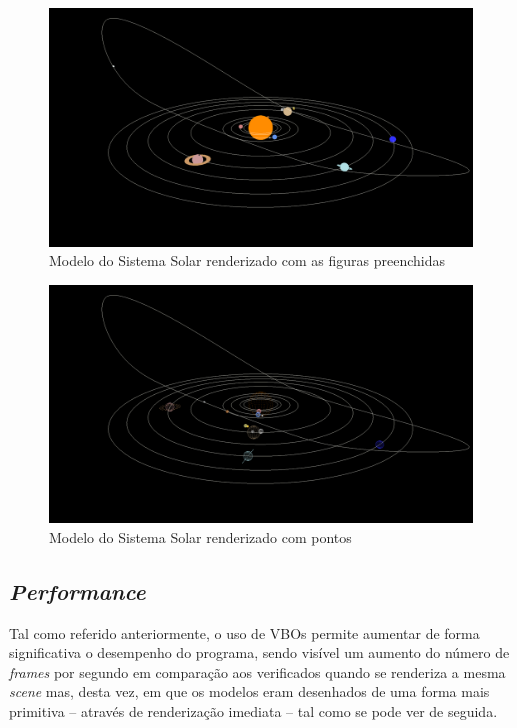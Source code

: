 \documentclass[a4paper, 11pt]{article}
\begin{document}
\begin{figure}[H]
    \centering
    \includegraphics[width=\textwidth]{img/filled.png}
    \caption{Modelo do Sistema Solar renderizado com as figuras preenchidas}
\end{figure}

\begin{figure}[H]
    \centering
    \includegraphics[width=\textwidth]{img/points.png}
    \caption{Modelo do Sistema Solar renderizado com pontos}
\end{figure}

\pagebreak

\subsection{\textit{Performance}}

Tal como referido anteriormente, o uso de VBOs permite aumentar de forma significativa o desempenho 
do programa, sendo visível um aumento do número de \textit{frames} por segundo em comparação 
aos verificados quando se renderiza a mesma \textit{scene} mas, desta vez, em que os modelos eram 
desenhados de uma forma mais primitiva -- através de renderização imediata -- tal como se pode 
ver de seguida.
\end{document}
